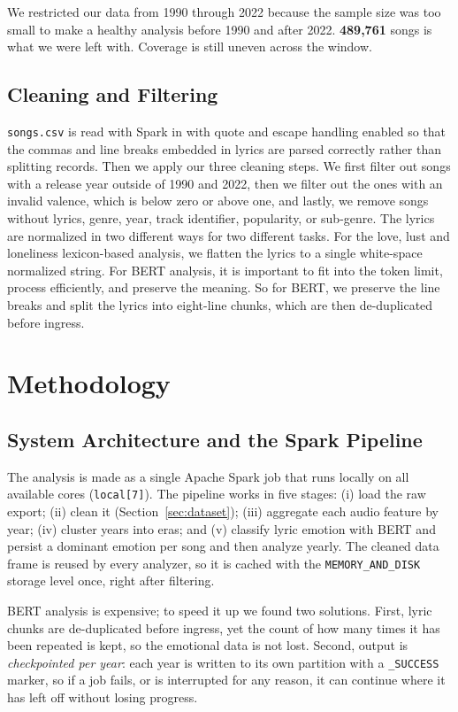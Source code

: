 \documentclass[conference]{IEEEtran}
\begin{document}
We restricted our data from 1990 through 2022 because the sample size was too small 
to make a healthy analysis before 1990 and after 2022.
\textbf{489{,}761} songs is what we were left with. Coverage
is still uneven across the window.

\subsection{Cleaning and Filtering}
\texttt{songs.csv} is read with Spark in with
quote and escape handling enabled so that the commas and line breaks embedded in
lyrics are parsed correctly rather than splitting records. Then we apply our three
cleaning steps. We first filter out songs with a release year outside of 1990 and 2022,
then we filter out the ones with an invalid valence, which is below zero or above one,
and lastly, we remove songs without lyrics, genre, year, track identifier, popularity, or
sub-genre. The lyrics are normalized in two different ways for two different tasks.
For the love, lust and loneliness lexicon-based analysis, we flatten the lyrics
to a single white-space normalized string. For BERT analysis, it is important to fit
into the token limit, process efficiently, and preserve the meaning.
So for BERT, we preserve the line breaks and split the lyrics into eight-line chunks, 
which are then de-duplicated before ingress.

\section{Methodology}

\subsection{System Architecture and the Spark Pipeline}
The analysis is made as a single Apache Spark job that runs locally on
all available cores (\texttt{local[7]}). The pipeline works in five stages:
(i) load the raw export; (ii) clean it (Section~\ref{sec:dataset});
(iii) aggregate each audio feature by year; (iv) cluster years into eras; and
(v) classify lyric emotion with BERT and persist a dominant emotion per song and then analyze yearly.
The cleaned data frame is reused by every analyzer, so it is cached with the
\texttt{MEMORY\_AND\_DISK} storage level once, right after filtering.

BERT analysis is expensive; to speed it up we found two solutions. First, 
lyric chunks are de-duplicated before ingress, yet the count of how many times
it has been repeated is kept, so the emotional data is not lost.
Second, output is \emph{checkpointed per year}: each year is written to its
own partition with a \texttt{\_SUCCESS} marker, so if a job fails, or is interrupted
for any reason, it can continue where it has left off without losing progress.
\end{document}
